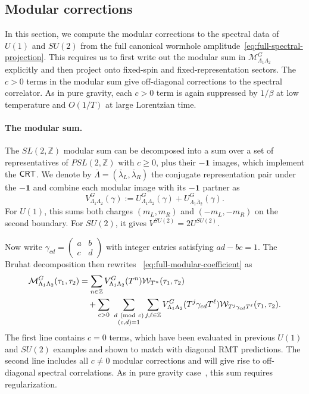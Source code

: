 \documentclass[11pt]{article}
\numberwithin{equation}{section}
\begin{document}
\subsection{Modular corrections}
\label{sec:jacobi-corrections}

In this section, we compute the modular corrections to the spectral data of $U(1)$ and $SU(2)$ from  the full canonical wormhole amplitude~\eqref{eq:full-spectral-projection}. This requires us to first write out the modular sum in  $\mathcal M^G_{\Lambda_1\Lambda_2}$ explicitly and then project onto fixed-spin and fixed-representation sectors. The $c>0$ terms  in the modular sum give off-diagonal corrections to the spectral correlator. As in pure gravity, each $c>0$ term is again suppressed by $1/\beta$ at low temperature and $O(1/T)$ at large Lorentzian time. 


\paragraph{The modular sum.}
The $SL(2,\mathbb{Z})$ modular sum can be decomposed into a sum over a set of representatives of $PSL(2,\mathbb{Z})$ with $c\geq 0$, plus their  $-\mathbf 1$ images, which implement the $\mathsf{CRT}$.  We denote by $\bar\Lambda=(\bar\lambda_L,\bar\lambda_R)$ the conjugate representation pair under the $-\mathbf 1$ and combine each modular image with its $-\mathbf 1$  partner as
\begin{equation}
V^G_{\Lambda_1\Lambda_2}(\gamma)
 :=U^G_{\Lambda_1\Lambda_2}(\gamma)
   +U^G_{\Lambda_1\bar\Lambda_2}(\gamma).
\label{eq:continuous-central-pair}
\end{equation}
For $U(1)$,  this sums  both charges  $(m_L,m_R)$ and $(-m_L,-m_R)$ on the second boundary. For $SU(2)$, it gives $V^{SU(2)}=2U^{SU(2)}$. 

Now write $\gamma_{cd}=\left(\begin{smallmatrix}a&b\\c&d\end{smallmatrix}\right)$ with integer entries satisfying $ad-bc=1$. The Bruhat decomposition then rewrites ~\eqref{eq:full-modular-coefficient} as
\begin{equation}
\begin{aligned}
 \mathcal M^G_{\Lambda_1\Lambda_2}(\tau_1,\tau_2)
 &=\sum_{n\in\mathbb Z}V^G_{\Lambda_1\Lambda_2}(T^n)
       \mathcal W_{T^n}(\tau_1,\tau_2)\\
 &\quad+\sum_{c>0}\ \sum_{\substack{d\ ({\rm mod}\ c)\\(c,d)=1}}
       \sum_{j,\ell\in\mathbb Z}
       V^G_{\Lambda_1\Lambda_2}(T^j\gamma_{cd}T^\ell)
       \mathcal W_{T^j\gamma_{cd}T^\ell}(\tau_1,\tau_2).
\end{aligned}
\label{PS_decomp}
\end{equation}
The first line contains $c=0$ terms, which have been evaluated in previous $U(1)$ and $SU(2)$ examples and shown to match with diagonal RMT predictions. The second line includes all $c\ne0$ modular corrections and will give rise to off-diagonal spectral correlations. As in pure gravity case~\cite{Cotler:2020ugk}, this sum requires regularization.
\end{document}
